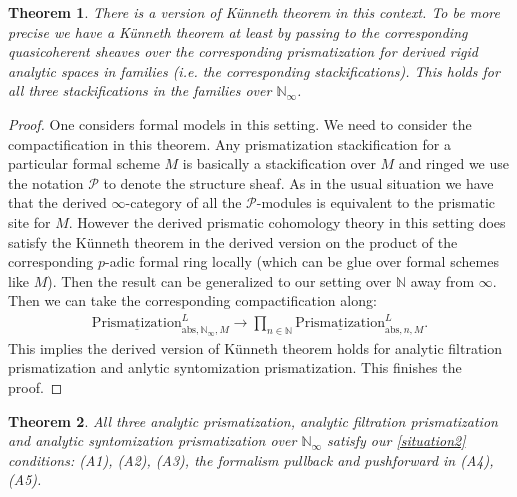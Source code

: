 \documentclass[12pt]{article}
\newtheorem{theorem}{Theorem}
\theoremstyle{definition}
\begin{document}
\begin{theorem}
There is a version of K\"unneth theorem in this context. To be more precise we have a K\"unneth theorem at least by passing to the corresponding quasicoherent sheaves over the corresponding prismatization for derived rigid analytic spaces in families (i.e. the corresponding stackifications). This holds for all three stackifications in the families over $\mathbb{N}_\infty$. 
\end{theorem}




\begin{proof}
One considers formal models in this setting. We need to consider the compactification in this theorem. Any prismatization stackification for a particular formal scheme $M$ is basically a stackification over $M$ and ringed we use the notation $\mathcal{P}$ to denote the structure sheaf. As in the usual situation we have that the derived $\infty$-category of all the $\mathcal{P}$-modules is equivalent to the prismatic site for $M$. However the derived prismatic cohomology theory in this setting does satisfy the K\"unneth theorem in the derived version on the product of the corresponding $p$-adic formal ring locally (which can be glue over formal schemes like $M$). Then the result can be generalized to our setting over $\mathbb{N}$ away from $\infty$. Then we can take the corresponding compactification along:
\begin{align}
{\underline{\mathrm{Prismatization}}}^L_{\mathrm{abs},\mathbb{N}_\infty,M}\rightarrow  \prod_{n\in \mathbb{N}} {\underline{\mathrm{Prismatization}}}^L_{\mathrm{abs},n,M}.
\end{align}
This implies the derived version of K\"unneth theorem holds for analytic filtration prismatization and anlytic syntomization prismatization. This finishes the proof.
\end{proof}

\begin{theorem}
All three analytic prismatization, analytic filtration prismatization and analytic syntomization prismatization over $\mathbb{N}_\infty$ satisfy our \cref{situation2} conditions: (A1), (A2), (A3), the formalism pullback and pushforward in (A4), (A5).
\end{theorem}
\end{document}
